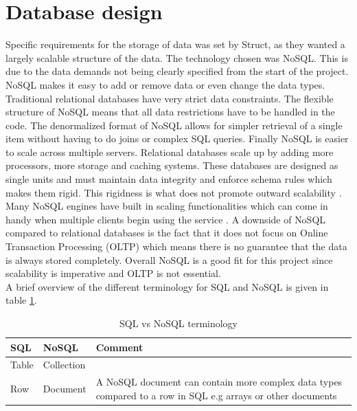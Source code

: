 \section{Database design}
Specific requirements for the storage of data was set by \gls{Struct}, as they wanted a largely scalable structure of the data. The technology chosen was \gls{NoSQL}.
This is due to the data demands not being clearly specified from the start of the project. \Gls{NoSQL} makes it easy to add or remove data or even change the data types. Traditional relational databases have very strict data constraints. The flexible structure of \gls{NoSQL} means that all data restrictions have to be handled in the code. The denormalized format of \gls{NoSQL} allows for simpler retrieval of a single item without having to do joins or complex SQL queries. Finally \gls{NoSQL} is easier to scale across multiple servers. Relational databases scale up by adding more processors, more storage and caching systems. These databases are designed as single units and must maintain data integrity and enforce schema rules which makes them rigid. This rigidness is what does not promote outward scalability \cite{NoSQLScalability}.  Many \gls{NoSQL} engines have built in scaling functionalities which can come in handy when multiple clients begin using the service \cite{SQLvsNOSQL}. A downside of \gls{NoSQL} compared to relational databases is the fact that it does not focus on Online Transaction Processing (OLTP) which means there is no guarantee that the data is always stored completely. Overall \gls{NoSQL} is a good fit for this project since scalability is imperative and OLTP is not essential.\\
A brief overview of the different terminology for SQL and \gls{NoSQL} is given in table \ref{sqlvsnosql_table}.
\begin{table}[H]
	\centering
	\caption{SQL vs \gls{NoSQL} terminology}
	\label{sqlvsnosql_table}
	\begin{tabular}{|l|l|p{8cm}|}
		\hline
		\textbf{SQL}   & \textbf{\gls{NoSQL}}     & \textbf{Comment}                                                                                                    \\ \hline
		Table & Collection &                                                                                                            \\ \hline
		Row   & Document   & A \gls{NoSQL} document can contain more complex data types compared to a row in SQL e.g arrays or other documents \\
		\hline
	\end{tabular}
\end{table}

